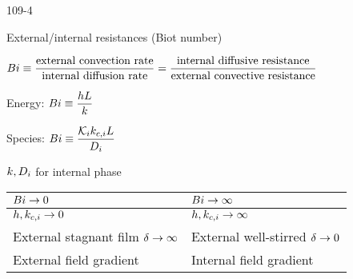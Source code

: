 \begin{mitframe}{109-4} 


\begin{listone}

	\item External/internal resistances (Biot number)
    
    \begin{listtwo}
	
    	\item $\biot \equiv \dfrac{\text{external convection rate}}{\text{internal diffusion  rate}}=\dfrac{\text{internal diffusive resistance}}{\text{external convective resistance}}$
        
        \item Energy: $\biot \equiv \dfrac{\planck\length}{\thermcond}$
        
        \item Species: $\biot \equiv \dfrac{\partcoeff\masstranscoeff\length}{\pdiff} $
        
        \item $\thermcond, \pdiff$ for internal phase

	\end{listtwo}

\begin{center}
\begin{tabular}
{| >{\centering\arraybackslash}m{4cm} | >{\centering\arraybackslash}m{4cm} |}
\hline 
 
$\biot \rightarrow 0$ &%
$\biot \rightarrow \infty$\\ \hline

$\planck,\masstranscoeff \rightarrow 0$ &%
$\planck,\masstranscoeff \rightarrow \infty$ \\ \hline

External stagnant film $\blthick \rightarrow \infty$  &%
External well-stirred $\blthick \rightarrow 0$ \\ \hline

External field gradient &%
Internal field gradient \\ \hline    
 
\end{tabular}
\end{center}

\end{listone}

\end{mitframe}